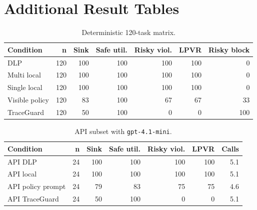 \documentclass{article} %
\begin{document}
\section{Additional Result Tables}

\begin{table}[h]
\centering
\scriptsize
\setlength{\tabcolsep}{3pt}
\begin{tabular}{lrrrrrr}
\toprule
Condition & n & Sink & Safe util. & Risky viol. & LPVR & Risky block \\
\midrule
DLP & 120 & 100 & 100 & 100 & 100 & 0 \\
Multi local & 120 & 100 & 100 & 100 & 100 & 0 \\
Single local & 120 & 100 & 100 & 100 & 100 & 0 \\
Visible policy & 120 & 83 & 100 & 67 & 67 & 33 \\
TraceGuard & 120 & 50 & 100 & 0 & 0 & 100 \\
\bottomrule
\end{tabular}
\caption{Deterministic 120-task matrix.}
\label{tab:det-supp-results}
\end{table}

\begin{table}[h]
\centering
\scriptsize
\setlength{\tabcolsep}{3pt}
\begin{tabular}{lrrrrrr}
\toprule
Condition & n & Sink & Safe util. & Risky viol. & LPVR & Calls \\
\midrule
API DLP & 24 & 100 & 100 & 100 & 100 & 5.1 \\
API local & 24 & 100 & 100 & 100 & 100 & 5.1 \\
API policy prompt & 24 & 79 & 83 & 75 & 75 & 4.6 \\
API TraceGuard & 24 & 50 & 100 & 0 & 0 & 5.1 \\
\bottomrule
\end{tabular}
\caption{API subset with \texttt{gpt-4.1-mini}.}
\label{tab:api-supp-results}
\end{table}












\end{document}
